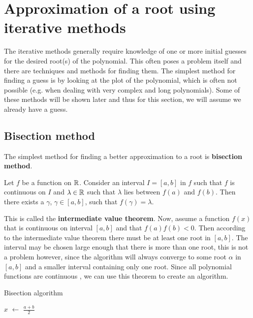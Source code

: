 \documentclass[
  digital, %
  table,   %
  nolof,     %
  nolot,     %
	draft, %
]{fithesis3}
\begin{document}
\section{Approximation of a root using iterative methods}
The iterative methods generally require knowledge of one or more initial guesses for the desired root(s) of the polynomial. This often poses a problem itself and there are techniques and methods for finding them. The simplest method for finding a guess is by looking at the plot of the polynomial, which is often not possible (e.g. when dealing with very complex and long polynomials). Some of these methods will be shown later and thus for this section, we will assume we already have a guess.

\subsection{Bisection method}
The simplest method for finding a better approximation to a root is \textbf{bisection method}. 
\begin{theorem}
Let $f$ be a function on $\mathbb{R}$. Consider an interval $I=[a,b]$ in $f$ such that $f$ is continuous on $I$ and $\lambda\in\mathbb{R}$ such that $\lambda$ lies between $f(a)$ and $f(b)$. Then there exists a $\gamma$, $\gamma\in[a,b]$, such that $f(\gamma)=\lambda$.
\end{theorem}
This is called the \textbf{intermediate value theorem}\parencite{interValue}. Now, assume a function $f(x)$ that is continuous on interval $[a,b]$ and that $f(a)f(b)<0$. Then according to the intermediate value theorem there must be at least one root in $[a,b]$. The interval may be chosen large enough that there is more than one root, this is not a problem however, since the algorithm will always converge to some root $\alpha$ in $[a,b]$ and a smaller interval containing only one root. Since all polynomial functions are continuous \parencite{polyCont}, we can use this theorem to create an algorithm.
\newcommand*\Let[2]{\State #1 $\gets$ #2}
\algrenewcommand{}
\algrenewcommand{}
\begin{algorithm}
  \caption{Bisection algorithm
    \label{alg:bisect}}
  \begin{algorithmic}[1]
    \Statex
      \Let{$x$}{$\frac{a + b}{2}$}
				\State{}
			\EndIf
				\State {}
				\Else \State {}
			\EndIf
    \EndFunction
  \end{algorithmic}
\end{algorithm}
\end{document}
